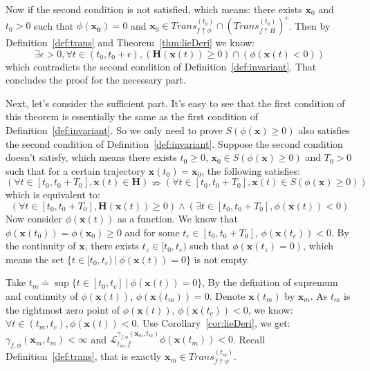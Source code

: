 \documentclass{jssc}
\begin{document}
Now if the second condition is not satisfied, which means: there exists $\boldsymbol{x}_0$ and $t_0 > 0$ such that $\phi(\boldsymbol{x_0}) = 0$ and $\boldsymbol{x}_0 \in Trans_{f \uparrow \phi}^{(t_0)} \cap (Trans_{f \uparrow H}^{(t_0)})^c$. Then by Definition~\ref{def:trans} and Theorem~\ref{thm:lieDeri} we know:
\begin{equation*}
		\exists \epsilon > 0, \forall t \in (t_0, t_0 + \epsilon), (\boldsymbol{H}(\boldsymbol{x}(t)) \geq 0) \cap (\phi(\boldsymbol{x}(t) < 0))
\end{equation*}
which contradicts the second condition of Definition~\ref{def:invariant}. That concludes the proof for the necessary part.

Next, let's consider the sufficient part. It's easy to see that the first condition of this theorem is essentially the same as the first condition of Definition~\ref{def:invariant}. So we only need to prove $S(\phi(\boldsymbol{x}) \geq 0)$ also satisfies the second condition of Definition~\ref{def:invariant}. Suppose the second condition doesn't satisfy, which means there exists $t_0 \geq 0$, $\boldsymbol{x}_0 \in S(\phi(\boldsymbol{x}) \geq 0)$ and $T_0 > 0$ such that for a certain trajectory $\boldsymbol{x}(t_0) = \boldsymbol{x}_0$, the following satisfies:
	\begin{equation*}
		(\forall t \in [t_0, t_0 + T_0], \boldsymbol{x}(t) \in \boldsymbol{H}) \nRightarrow (\forall t \in [t_0, t_0 + T_0], \boldsymbol{x}(t) \in S(\phi(\boldsymbol{x}) \geq 0))
	\end{equation*}
which is equivalent to:
	\begin{equation*}
		(\forall t \in [t_0, t_0 + T_0], \boldsymbol{H}(\boldsymbol{x}(t)) \geq 0) \wedge (\exists t \in [t_0, t_0 + T_0], \phi(\boldsymbol{x}(t)) < 0)
	\end{equation*}
Now consider $\phi(\boldsymbol{x}(t))$ as a function. We know that $\phi(\boldsymbol{x}(t_0)) = \phi(\boldsymbol{x}_0) \geq 0$ and for some $t_c \in [t_0, t_0 + T_0]$, $\phi(\boldsymbol{x}(t_c)) < 0$. By the continuity of $\boldsymbol{x}$, there exists $t_z \in [t_0, t_c)$ such that $\phi(\boldsymbol{x}(t_z) = 0)$, which means the set $\{ t \in [t_0, t_c)\ |\ \phi(\boldsymbol{x}(t)) = 0 \}$ is not empty.

Take $t_m \doteq \sup\{t \in [t_0, t_c]\ |\ \phi (\boldsymbol{x}(t)) = 0 \}$, By the definition of supremum and continuity of $\phi(\boldsymbol{x}(t))$, $\phi(\boldsymbol{x}(t_m)) = 0$. Denote $\boldsymbol{x}(t_m)$ by $\boldsymbol{x}_m$. As $t_m$ is the rightmost zero point of $\phi(\boldsymbol{x}(t))$, $\phi(\boldsymbol{x}(t_c)) < 0$, we know: $\forall t \in (t_m, t_c),\phi(\boldsymbol{x}(t)) < 0$. Use Corollary~\ref{cor:lieDeri}, we get:  $\gamma_{f, \phi}(\boldsymbol{x}_m, t_m) < \infty$ and $\mathcal{L}_{t_m, f}^{\gamma_{f, \phi}(\boldsymbol{x}_m, t_m)} \phi (\boldsymbol{x}(t_m)) < 0$. Recall Definition~\ref{def:trans}, that is exactly $\boldsymbol{x}_m \in Trans_{f \uparrow \phi}^{(t_m)}$.
\end{document}
